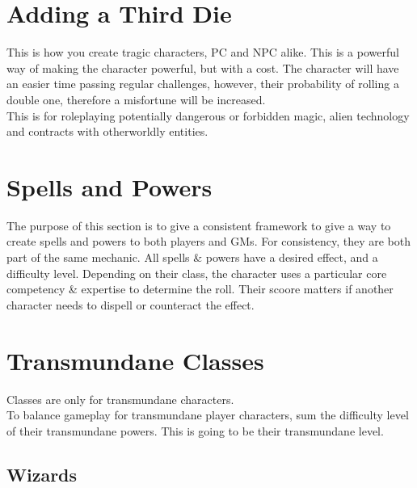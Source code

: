\documentclass{LegrandOrangeTufteBook}
\newcommand{\term}[1]{\textcolor{colorTerm}{#1}}
\begin{document}

\section*{Adding a Third Die}

This is how you create tragic characters, PC and NPC alike.
This is a powerful way of making the character powerful, but with a cost.
The character will have an easier time passing regular challenges,
however, their probability of rolling a double one, therefore a \term{misfortune}
will be increased.\\

This is for roleplaying potentially dangerous or forbidden magic, alien technology and contracts with otherworldly entities.

\section*{Spells and Powers}

The purpose of this section is to give a consistent framework to give a way to create spells and powers to both players and GMs.
For consistency, they are both part of the same mechanic.
All spells \& powers have a desired effect, and a \term{difficulty level}.
Depending on their \term{class}, the character uses a particular \term{core competency} \& \term{expertise} to determine the roll.
Their \term{scoore} matters if another character needs to dispell or counteract the effect.


\section*{Transmundane Classes}

Classes are only for \term{transmundane} characters.\\

To balance gameplay for \term{transmundane} player characters,
sum the \term{difficulty level} of their \term{transmundane} powers.
This is going to be their \term{transmundane level}.
\\

\subsection*{Wizards}
\end{document}

